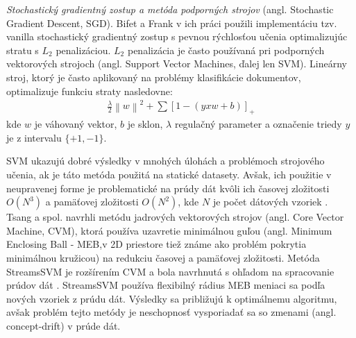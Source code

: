 \textit{Stochastický gradientný zostup a metóda podporných strojov} (angl. Stochastic Gradient Descent, SGD). Bifet a Frank v ich práci použili implementáciu tzv. vanilla stochastický gradientný zostup s pevnou rýchlosťou učenia optimalizujúc stratu s $L_2$ penalizáciou. $L_2$ penalizácia je často používaná pri podporných vektorových strojoch (angl. Support Vector Machines, ďalej len SVM). Lineárny stroj, ktorý je často aplikovaný na problémy klasifikácie dokumentov, optimalizuje funkciu straty nasledovne:
\begin{align*}
\frac{\lambda }{2}\left \| w \right \|^{2}+\sum [1-(yxw + b)]_{+}
\end{align*}
kde $w$ je váhovaný vektor, $b$ je sklon, $\lambda$ regulačný parameter a označenie triedy $y$ je z intervalu $\{+1, -1\}$.
\par
SVM ukazujú dobré výsledky v mnohých úlohách a problémoch strojového učenia, ak je táto metóda použitá na statické datasety. Avšak, ich použitie v neupravenej forme je problematické na prúdy dát kvôli ich časovej zložitosti $O(N^3)$ a pamäťovej zložitosti $O(N^2)$, kde $N$ je počet dátových vzoriek \citep{nguyen2015survey}. Tsang a spol. navrhli metódu jadrových vektorových strojov (angl. Core Vector Machine, CVM), ktorá používa uzavretie minimálnou guľou (angl. Minimum Enclosing Ball - MEB,v 2D priestore tiež známe ako problém pokrytia minimálnou kružicou) na redukciu časovej a pamäťovej zložitosti. Metóda StreamsSVM je rozšírením CVM a bola navrhnutá s ohľadom na spracovanie prúdov dát \citep{rai2009streamed}. StreamsSVM používa flexibilný rádius MEB meniaci sa podľa nových vzoriek z prúdu dát. Výsledky sa približujú k optimálnemu algoritmu, avšak problém tejto metódy je neschopnosť vysporiadať sa so zmenami (angl. concept-drift) v prúde dát.



